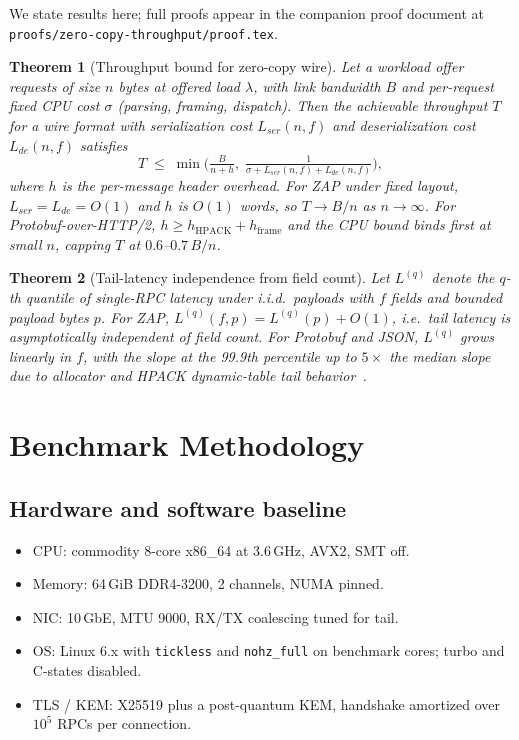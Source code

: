 \documentclass[11pt]{article}
\newtheorem{theorem}{Theorem}
\theoremstyle{definition}
\theoremstyle{remark}
\begin{document}
We state results here; full proofs appear in the companion proof
document at \texttt{proofs/zero-copy-throughput/proof.tex}.

\begin{theorem}[Throughput bound for zero-copy wire]
\label{thm:throughput}
Let a workload offer requests of size $n$ bytes at offered load
$\lambda$, with link bandwidth $B$ and per-request fixed CPU cost
$\sigma$ (parsing, framing, dispatch). Then the achievable throughput
$T$ for a wire format with serialization cost $L_{\textit{ser}}(n,f)$ and
deserialization cost $L_{\textit{de}}(n,f)$ satisfies
\[
  T \;\leq\;
  \min\!\Big(
    \tfrac{B}{n+h},\;
    \tfrac{1}{\sigma + L_{\textit{ser}}(n,f) + L_{\textit{de}}(n,f)}
  \Big),
\]
where $h$ is the per-message header overhead. For ZAP under fixed
layout, $L_{\textit{ser}}=L_{\textit{de}}=O(1)$ and $h$ is $O(1)$ words, so
$T \to B/n$ as $n \to \infty$. For Protobuf-over-HTTP/2,
$h \geq h_{\text{HPACK}} + h_{\text{frame}}$ and the CPU bound binds first
at small $n$, capping $T$ at $0.6$--$0.7\,B/n$.
\end{theorem}

\begin{theorem}[Tail-latency independence from field count]
\label{thm:tail}
Let $L^{(q)}$ denote the $q$-th quantile of single-RPC latency under
i.i.d.\ payloads with $f$ fields and bounded payload bytes $p$. For ZAP,
$L^{(q)}(f,p) = L^{(q)}(p) + O(1)$, i.e.\ tail latency is asymptotically
independent of field count. For Protobuf and JSON, $L^{(q)}$ grows
linearly in $f$, with the slope at the 99.9th percentile up to
$5\times$ the median slope due to allocator and HPACK
dynamic-table tail behavior~\cite{dean2013tail,xu2024microsecond}.
\end{theorem}

\section{Benchmark Methodology}
\label{sec:method}

\subsection{Hardware and software baseline}
\begin{itemize}
  \item CPU: commodity 8-core x86\_64 at 3.6\,GHz, AVX2, SMT off.
  \item Memory: 64\,GiB DDR4-3200, 2 channels, NUMA pinned.
  \item NIC: 10\,GbE, MTU 9000, RX/TX coalescing tuned for tail.
  \item OS: Linux 6.x with \texttt{tickless} and \texttt{nohz\_full}
        on benchmark cores; turbo and C-states disabled.
  \item TLS / KEM: X25519 plus a post-quantum KEM, handshake
        amortized over $10^5$ RPCs per connection.
\end{itemize}
\end{document}
